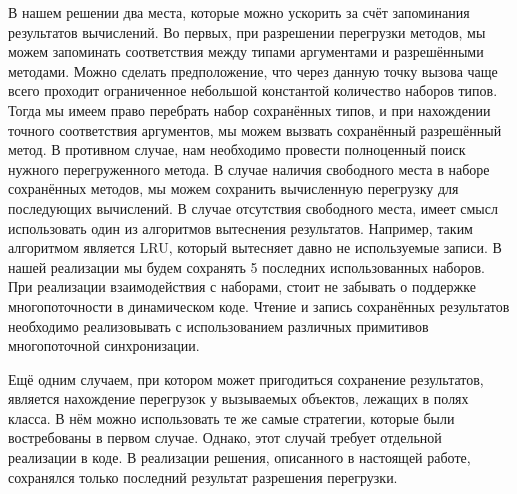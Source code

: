В нашем решении два места, которые можно ускорить за счёт запоминания результатов вычислений. Во первых, при разрешении перегрузки методов, мы можем запоминать соответствия между типами аргументами и разрешёнными методами. Можно сделать предположение, что через данную точку вызова чаще всего проходит ограниченное небольшой константой количество наборов типов. Тогда мы имеем право перебрать набор сохранённых типов, и при нахождении точного соответствия аргументов, мы можем вызвать сохранённый  разрешённый метод. В противном случае, нам необходимо провести полноценный поиск нужного перегруженного метода. В случае наличия свободного места в наборе сохранённых методов, мы можем сохранить вычисленную перегрузку для последующих вычислений. В случае отсутствия свободного места, имеет смысл использовать один из алгоритмов вытеснения результатов. Например, таким алгоритмом является LRU, который вытесняет давно не используемые записи. В нашей реализации мы будем сохранять 5 последних использованных наборов. При реализации взаимодействия с наборами, стоит не забывать о поддержке многопоточности в динамическом коде. Чтение и запись сохранённых результатов необходимо реализовывать с использованием различных примитивов многопоточной синхронизации.

Ещё одним случаем, при котором может пригодиться сохранение результатов, является нахождение перегрузок у вызываемых объектов, лежащих в полях класса. В нём можно использовать те же самые стратегии, которые были востребованы в первом случае. Однако, этот случай требует отдельной реализации в коде. В реализации решения, описанного в настоящей работе, сохранялся только последний результат разрешения перегрузки.
